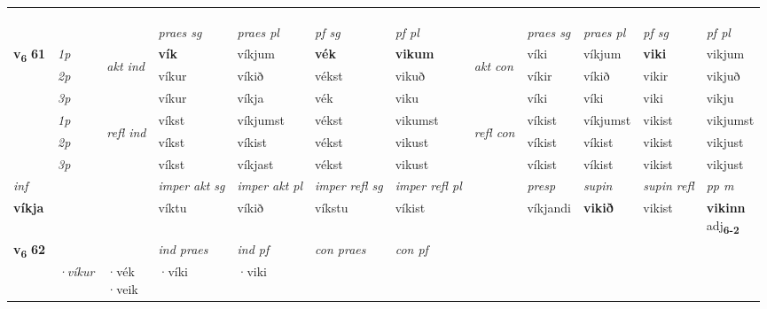 \begin{longtable}[l]{X>{\footnotesize\itshape}llXXXXlXXXX}
\midrule
 & \\*
   & \\*
  & \\
   \midrule
 & &   & \textit{praes sg}  & \textit{praes pl}    & \textit{ pf sg} & \textit{pf pl} & & \textit{praes sg}  & \textit{praes pl}    & \textit{pf sg} & \textit{pf pl }  \\ \cmidrule{4-7} \cmidrule{9-12}
 \multirow{2}{*}{{{\textbf{v{\textsubscript{6}}} \Large{\textbf{61}}}}}  & 1p & \multirow{3}{*}{\begin{turn}{90}\textit{akt ind}\end{turn}} & \textbf{vík} & víkjum & \textbf{vék} & \textbf{vikum} & \multirow{3}{*}{\begin{turn}{90}\textit{akt con}\end{turn}} &víki & víkjum & \textbf{viki} & vikjum\\*
 & 2p &  &  víkur  & víkið & vékst & vikuð & & víkir & víkið & vikir & vikjuð \\*
 & 3p &  & víkur & víkja & vék & viku & & víki & víki& viki & vikju \\*
\cmidrule{4-7} \cmidrule{9-12}
 & 1p & \multirow{3}{*}{\begin{turn}{90}\textit{refl ind}\end{turn}}  & víkst & víkjumst & vékst & vikumst & \multirow{3}{*}{\begin{turn}{90}\textit{refl con}\end{turn}}  &víkist & víkjumst & vikist & vikjumst \\*
 & 2p &  & víkst & víkist & vékst & vikust & &víkist & víkist & vikist & vikjust \\*
 & 3p  & & víkst & víkjast & vékst & vikust & & víkist & víkist& vikist & vikjust \\*
\cmidrule{4-7} \cmidrule{9-12}

   {\textit{inf}} & &  & \textit{imper akt sg} & \textit{imper akt pl} & \textit{imper refl sg} & \textit{imper refl pl} && \textit{presp} & \textit{supin} & \textit{supin refl} & \textit{pp m} \\*
  {\textbf{víkja}} & && víktu  & víkið & víkstu & víkist && víkjandi &  \textbf{vikið} & vikist & \specialcell{\textbf{vikinn} \\ adj\textbf{\textsubscript{6-2}}} \\*

\midrule

\multirow{2}{*}{{{\textbf{v{\textsubscript{6}}} \Large{\textbf{62}}}}}  &&&  \textit{ind praes} & \textit{ind pf} & \textit{con praes} & \textit{con pf} \\*
\multicolumn{3}{r}{\textit{e-m}} & ·víkur & \specialcell{·vék\\  ·veik} & ·víki & ·viki \\*


\end{longtable}
